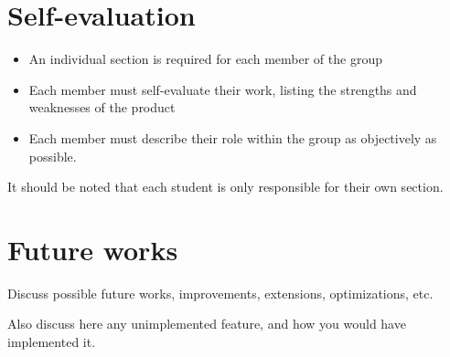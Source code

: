 \documentclass{scrartcl}
\begin{document}
\section{Self-evaluation}\label{self-evaluation}

\begin{itemize}
  \item An individual section is required for each member of the group
  \item Each member must self-evaluate their work, listing the strengths and weaknesses of the product
  \item Each member must describe their role within the group as objectively as possible.
\end{itemize}

It should be noted that each student is only responsible for their own section.

\section{Future works}\label{future-works}

Discuss possible future works, improvements, extensions, optimizations, etc.

Also discuss here any unimplemented feature, and how you would have implemented it.



\end{document}
